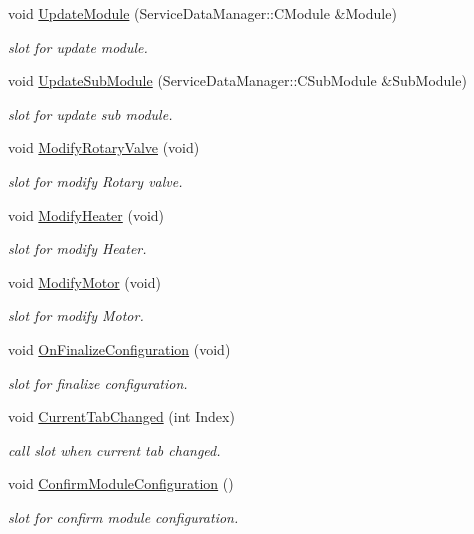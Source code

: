 \begin{DoxyCompactItemize}
\item 
void \hyperlink{classSystemTracking_1_1CRotaryValve_aa1c1096efaa4e1d3180575a37d9b1b15}{\-Update\-Module} (\-Service\-Data\-Manager\-::\-C\-Module \&\-Module)
\begin{DoxyCompactList}\small\item\em slot for update module. \end{DoxyCompactList}\item 
void \hyperlink{classSystemTracking_1_1CRotaryValve_ae210de713165c595db76a4645cbb27a8}{\-Update\-Sub\-Module} (\-Service\-Data\-Manager\-::\-C\-Sub\-Module \&\-Sub\-Module)
\begin{DoxyCompactList}\small\item\em slot for update sub module. \end{DoxyCompactList}\item 
void \hyperlink{classSystemTracking_1_1CRotaryValve_a6e0848acc61f232eeff7cd1cddaeec41}{\-Modify\-Rotary\-Valve} (void)
\begin{DoxyCompactList}\small\item\em slot for modify \-Rotary valve. \end{DoxyCompactList}\item 
void \hyperlink{classSystemTracking_1_1CRotaryValve_a6de4efb24c6e926b1836e3adcc764d99}{\-Modify\-Heater} (void)
\begin{DoxyCompactList}\small\item\em slot for modify \-Heater. \end{DoxyCompactList}\item 
void \hyperlink{classSystemTracking_1_1CRotaryValve_afb004c32f6967c311b70907f24ca37e6}{\-Modify\-Motor} (void)
\begin{DoxyCompactList}\small\item\em slot for modify \-Motor. \end{DoxyCompactList}\item 
void \hyperlink{classSystemTracking_1_1CRotaryValve_a6235f04376fe6edea28504749487fc6c}{\-On\-Finalize\-Configuration} (void)
\begin{DoxyCompactList}\small\item\em slot for finalize configuration. \end{DoxyCompactList}\item 
void \hyperlink{classSystemTracking_1_1CRotaryValve_a6094f1e47effa3e2d9566969c31fab3e}{\-Current\-Tab\-Changed} (int \-Index)
\begin{DoxyCompactList}\small\item\em call slot when current tab changed. \end{DoxyCompactList}\item 
void \hyperlink{classSystemTracking_1_1CRotaryValve_acc95b1ddee34b82bb38f3ae7b12df58f}{\-Confirm\-Module\-Configuration} ()
\begin{DoxyCompactList}\small\item\em slot for confirm module configuration. \end{DoxyCompactList}\end{DoxyCompactItemize}
